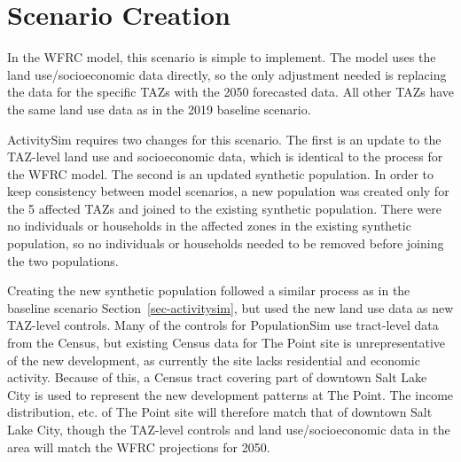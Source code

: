 \documentclass[fancy, oneside, mastersfancy, ms]{byuthesis}
\begin{document}
\begin{table}

\caption{\label{tbl-the-point-data-new}TAZ-level Socioeconomic Data for
The Point (Land Use Scenario)}


\end{table}%

\section{Scenario Creation}\label{scenario-creation}

In the WFRC model, this scenario is simple to implement. The model uses
the land use/socioeconomic data directly, so the only adjustment needed
is replacing the data for the specific TAZs with the 2050 forecasted
data. All other TAZs have the same land use data as in the 2019 baseline
scenario.

ActivitySim requires two changes for this scenario. The first is an
update to the TAZ-level land use and socioeconomic data, which is
identical to the process for the WFRC model. The second is an updated
synthetic population. In order to keep consistency between model
scenarios, a new population was created only for the 5 affected TAZs and
joined to the existing synthetic population. There were no individuals
or households in the affected zones in the existing synthetic
population, so no individuals or households needed to be removed before
joining the two populations.

Creating the new synthetic population followed a similar process as in
the baseline scenario Section~\ref{sec-activitysim}, but used the new
land use data as new TAZ-level controls. Many of the controls for
PopulationSim use tract-level data from the Census, but existing Census
data for The Point site is unrepresentative of the new development, as
currently the site lacks residential and economic activity. Because of
this, a Census tract covering part of downtown Salt Lake City is used to
represent the new development patterns at The Point. The income
distribution, etc. of The Point site will therefore match that of
downtown Salt Lake City, though the TAZ-level controls and land
use/socioeconomic data in the area will match the WFRC projections for
2050.
\end{document}
